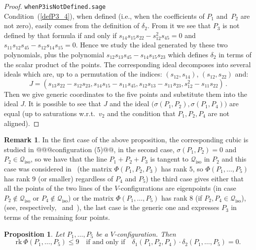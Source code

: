 \documentclass{amsart}
\theoremstyle{plain}
\newtheorem{prop}[lemma]{Proposition}
\theoremstyle{definition}
\newtheorem{rmk}[lemma]{Remark}
\newcommand{\iso}{\mathcal{Q}_{\mathrm{iso}}}
\newcommand{\rk}{\ensuremath{\mathrm{rk}}}
\begin{document}
%
\begin{proof}
\verb+whenP3isNotDefined.sage+\\
Condition~(\ref{defP3_4}), when defined (i.e., when the coefficients of $P_1$ and~$P_2$ are not zero), easily comes from the definition of $\delta_2$.
From it we see that $P_3$ is not defined by that formula if and only if
$s_{14}s_{15}s_{22}-s_{12}^2s_{45}=0$ and $s_{11}s_{12}s_{45}-s_{12}s_{14}s_{15}=0$.
Hence we study the ideal generated by these two polynomials, plus the
polynomial $s_{12}s_{13}s_{45}-s_{14}s_{15} s_{23}$ which defines
$\delta_2$ in terms of the scalar product of the points. The corresponding
ideal decomposes into several ideals which are, up to a permutation of
the indices: $(s_{12}, s_{14})$, $(s_{12}, s_{22})$ and:
%
\[
J = (s_{13}s_{22} - s_{12}s_{23}, s_{14}s_{15} - s_{11}s_{45}, s_{12}s_{13} -
s_{11}s_{23}, s_{12}^2 - s_{11}s_{22}) \,.
\]
%
Then we give generic coordinates to the five
points and substitute them into the ideal $J$. It is possible to see that
$J$ and the ideal $\bigl(\sigma(P_1, P_2), \sigma(P_1, P_4)\bigr)$ are equal (up to
saturations w.r.t.\ $v_2$ and the condition that $P_1, P_2, P_4$ are not
aligned).
\end{proof}
%
\begin{rmk}
In the first case of the above proposition, the corresponding cubic
is studied in @@@configuration (5)@@, in the
second case, $\sigma(P_1, P_2) = 0$ and $P_2\in \iso$, so
we have that the line $P_1+P_2+P_3$ is tangent to $\iso$ in $P_2$
and this case was considered in~
(the matrix $\Phi(P_1, P_2, P_3)$ has rank $5$, so
$\Phi(P_1, \dots, P_5)$ has rank $9$ (or smaller) regardless of
$P_4$ and $P_5$)
the third case gives either that all the
points of the two lines of the $V$-configurations are eigenpoints (in case
$P_2 \not\in \iso$ or $P_4 \not\in \iso$) or the matrix $\Phi(P_1, \dots, P_5)$
has rank $8$ (if $P_2, P_4 \in \iso$), (see, respectively,~
and~),
the last case is the generic one and expresses $P_3$ in terms of the remaining
four points.
\end{rmk}
%
\begin{prop}
\label{prop:d1d2}
Let $P_1, \dots, P_5$ be a $V$-configuration. Then
\[
\rk \ \Phi(P_1, \dots, P_5) \leq 9
\quad \mbox{
if and only if} \quad
\delta_1(P_1, P_2, P_4) \cdot \delta_2(P_1, \dots, P_5) = 0.
\]
\end{prop}
\end{document}

